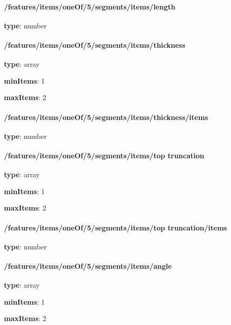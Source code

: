 \paragraph{/features/items/oneOf/5/segments/items/length} \begin{itemized}
\item {\bf type}: number
\end{itemized}\paragraph{/features/items/oneOf/5/segments/items/thickness} \begin{itemized}
\item {\bf type}: array
\item {\bf minItems}: 1
\item {\bf maxItems}: 2
\paragraph{/features/items/oneOf/5/segments/items/thickness/items} \begin{itemized}
\item {\bf type}: number
\end{itemized}\end{itemized}\paragraph{/features/items/oneOf/5/segments/items/top truncation} \begin{itemized}
\item {\bf type}: array
\item {\bf minItems}: 1
\item {\bf maxItems}: 2
\paragraph{/features/items/oneOf/5/segments/items/top truncation/items} \begin{itemized}
\item {\bf type}: number
\end{itemized}\end{itemized}\paragraph{/features/items/oneOf/5/segments/items/angle} \begin{itemized}
\item {\bf type}: array
\item {\bf minItems}: 1
\item {\bf maxItems}: 2

\end{itemized}
